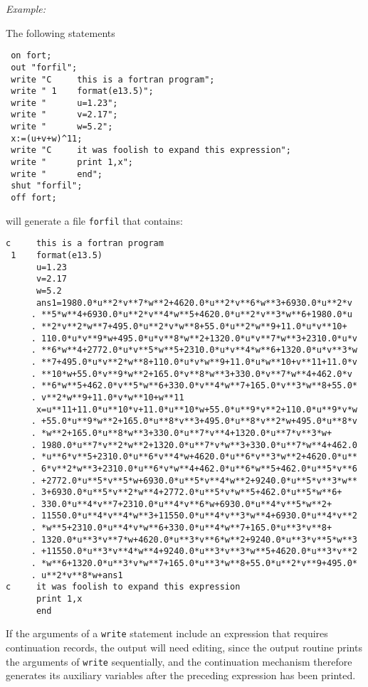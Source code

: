 \textit{Example:}

The following {\REDUCE} statements
\begin{verbatim}
 on fort;
 out "forfil";
 write "C     this is a fortran program";
 write " 1    format(e13.5)";
 write "      u=1.23";
 write "      v=2.17";
 write "      w=5.2";
 x:=(u+v+w)^11;
 write "C     it was foolish to expand this expression";
 write "      print 1,x";
 write "      end";
 shut "forfil";
 off fort;
\end{verbatim}
will generate a file \texttt{forfil} that contains:

{\small
\begin{verbatim}
c     this is a fortran program
 1    format(e13.5)
      u=1.23
      v=2.17
      w=5.2
      ans1=1980.0*u**2*v**7*w**2+4620.0*u**2*v**6*w**3+6930.0*u**2*v
     . **5*w**4+6930.0*u**2*v**4*w**5+4620.0*u**2*v**3*w**6+1980.0*u
     . **2*v**2*w**7+495.0*u**2*v*w**8+55.0*u**2*w**9+11.0*u*v**10+
     . 110.0*u*v**9*w+495.0*u*v**8*w**2+1320.0*u*v**7*w**3+2310.0*u*v
     . **6*w**4+2772.0*u*v**5*w**5+2310.0*u*v**4*w**6+1320.0*u*v**3*w
     . **7+495.0*u*v**2*w**8+110.0*u*v*w**9+11.0*u*w**10+v**11+11.0*v
     . **10*w+55.0*v**9*w**2+165.0*v**8*w**3+330.0*v**7*w**4+462.0*v
     . **6*w**5+462.0*v**5*w**6+330.0*v**4*w**7+165.0*v**3*w**8+55.0*
     . v**2*w**9+11.0*v*w**10+w**11
      x=u**11+11.0*u**10*v+11.0*u**10*w+55.0*u**9*v**2+110.0*u**9*v*w
     . +55.0*u**9*w**2+165.0*u**8*v**3+495.0*u**8*v**2*w+495.0*u**8*v
     . *w**2+165.0*u**8*w**3+330.0*u**7*v**4+1320.0*u**7*v**3*w+
     . 1980.0*u**7*v**2*w**2+1320.0*u**7*v*w**3+330.0*u**7*w**4+462.0
     . *u**6*v**5+2310.0*u**6*v**4*w+4620.0*u**6*v**3*w**2+4620.0*u**
     . 6*v**2*w**3+2310.0*u**6*v*w**4+462.0*u**6*w**5+462.0*u**5*v**6
     . +2772.0*u**5*v**5*w+6930.0*u**5*v**4*w**2+9240.0*u**5*v**3*w**
     . 3+6930.0*u**5*v**2*w**4+2772.0*u**5*v*w**5+462.0*u**5*w**6+
     . 330.0*u**4*v**7+2310.0*u**4*v**6*w+6930.0*u**4*v**5*w**2+
     . 11550.0*u**4*v**4*w**3+11550.0*u**4*v**3*w**4+6930.0*u**4*v**2
     . *w**5+2310.0*u**4*v*w**6+330.0*u**4*w**7+165.0*u**3*v**8+
     . 1320.0*u**3*v**7*w+4620.0*u**3*v**6*w**2+9240.0*u**3*v**5*w**3
     . +11550.0*u**3*v**4*w**4+9240.0*u**3*v**3*w**5+4620.0*u**3*v**2
     . *w**6+1320.0*u**3*v*w**7+165.0*u**3*w**8+55.0*u**2*v**9+495.0*
     . u**2*v**8*w+ans1
c     it was foolish to expand this expression
      print 1,x
      end
\end{verbatim}
}
If the arguments of a \texttt{write} statement include an expression that
requires continuation records, the output will need editing, since the
output routine prints the arguments of \texttt{write} sequentially, and the
continuation mechanism therefore generates its auxiliary variables after
the preceding expression has been printed.

